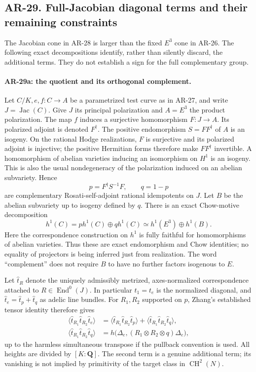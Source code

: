 \subsection*{AR-29. Full-Jacobian diagonal terms and their remaining constraints}

The Jacobian cone in AR-28 is larger than the fixed $E^3$ cone in
AR-26.  The following exact decompositions identify, rather than
silently discard, the additional terms.  They do not establish a sign
for the full complementary group.

\paragraph{AR-29a: the quotient and its orthogonal complement.}
Let $C/K,e,f:C\to A$ be a parametrized test curve as in AR-27,
and write $J=\operatorname{Jac}(C)$.  Give $J$ its principal
polarization and $A=E^3$ the product polarization.  The map $f$
induces a surjective homomorphism $F:J\to A$.  Its polarized adjoint
is denoted $F^\dagger$.  The positive endomorphism
$S=FF^\dagger$ of $A$ is an isogeny.  On the rational Hodge realizations, $F$ is
surjective and its polarized adjoint is injective; the positive
Hermitian forms therefore make $FF^\dagger$ invertible.  A
homomorphism of abelian varieties inducing an isomorphism on
$H^1$ is an isogeny.  This is also the usual nondegeneracy of
the polarization induced on an abelian subvariety.  Hence
\[
 p=F^\dagger S^{-1}F,\qquad q=1-p
\]
are complementary Rosati-self-adjoint rational idempotents on $J$.
Let $B$ be the abelian subvariety up to isogeny defined by $q$.
There is an exact Chow-motive decomposition
\[
 h^1(C)=p h^1(C)\oplus q h^1(C)
       \simeq h^1(E^3)\oplus h^1(B).
\]
Here the correspondence construction on $h^1$ is fully faithful
for homomorphisms of abelian varieties.  Thus these are exact
endomorphism and Chow identities; no equality of projectors is
being inferred just from realization.  The word ``complement''
does not require $B$ to have no further factors isogenous to $E$.

Let $\widehat t_R$ denote the uniquely admissibly metrized,
axes-normalized correspondence attached to $R\in\operatorname{End}^0(J)$.
In particular $t_1=t_e$ is the normalized diagonal, and
$\widehat t_e=\widehat t_p+\widehat t_q$ as adelic line bundles.
For $R_1,R_2$ supported on $p$, Zhang's established tensor identity
therefore gives
\[
 \begin{split}
 \langle\widehat t_{R_1}\widehat t_{R_2}\widehat t_e\rangle
 &=\langle\widehat t_{R_1}\widehat t_{R_2}\widehat t_p\rangle
   +\langle\widehat t_{R_1}\widehat t_{R_2}\widehat t_q\rangle,\\
 \langle\widehat t_{R_1}\widehat t_{R_2}\widehat t_q\rangle
 &=h\bigl(\Delta_e,(R_1\otimes R_2\otimes q)\Delta_e\bigr),
 \end{split}                                                    \tag{AR.29.1}
\]
up to the harmless simultaneous transpose if the pullback convention
is used.  All heights are divided by $[K:\mathbf Q]$.
The second term is a genuine additional term; its vanishing is
not implied by primitivity of the target class in $\operatorname{CH}^2(N)$.


